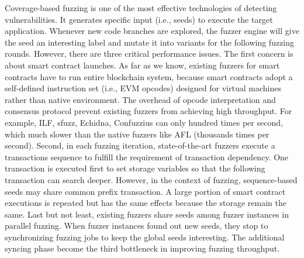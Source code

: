 Coverage-based fuzzing is one of the most effective technologies of detecting vulnerabilities\cite{fuzzingsurvey}. 
It generates specific input (i.e., seeds) to execute the target application.
Whenever new code branches are explored, the fuzzer engine will give the seed an interesting label and mutate it into variants for the following fuzzing rounds.
However, there are three critical performance issues.
%
The first concern is about smart contract launches. 
As far as we know, existing fuzzers for smart contracts have to run entire blockchain system, because smart contracts adopt a self-defined instruction set (i.e., EVM opcodes) designed for virtual machines rather than native environment. 
The overhead of opcode interpretation and consensus protocol prevent existing fuzzers from achieving high throughput. 
For example, ILF\cite{ilf_ccs}, sfuzz\cite{sfuzz_icse}, Echidna\cite{echidna_issta}, Confuzzius\cite{confuzzius_eurosp} can only hundred times per second, which much slower than the native fuzzers like AFL\cite{afl} (thousands times per second).
%
Second, in each fuzzing iteration, state-of-the-art fuzzers execute a transactions sequence to fulfill the requirement of transaction dependency\cite{confuzzius_eurosp}.
One transaction is executed first to set storage variables so that the following transaction can search deeper. 
However, in the context of fuzzing, sequence-based seeds may share common prefix transaction.
A large portion of smart contract executions is repeated but has the same effects because the storage remain the same. 
%
Last but not least, existing fuzzers share seeds among fuzzer instances in parallel fuzzing.
When fuzzer instances found out new seeds, they stop to synchronizing fuzzing jobs to keep the global seeds interesting.
The additional syncing phase become the third bottleneck in improving fuzzing throughput. 

